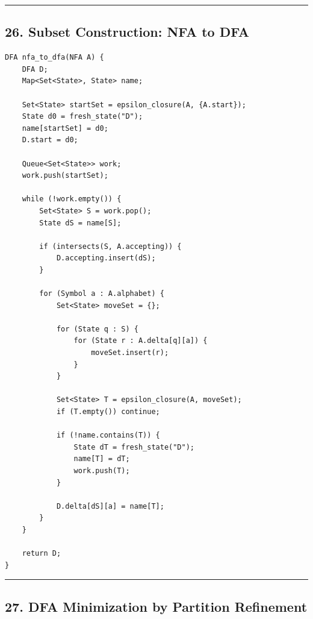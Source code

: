 \documentclass[10pt,letterpaper]{article}
\begin{document}
\medskip\hrule\medskip

\subsection*{26. Subset Construction: NFA to DFA}

\begin{verbatim}
DFA nfa_to_dfa(NFA A) {
    DFA D;
    Map<Set<State>, State> name;

    Set<State> startSet = epsilon_closure(A, {A.start});
    State d0 = fresh_state("D");
    name[startSet] = d0;
    D.start = d0;

    Queue<Set<State>> work;
    work.push(startSet);

    while (!work.empty()) {
        Set<State> S = work.pop();
        State dS = name[S];

        if (intersects(S, A.accepting)) {
            D.accepting.insert(dS);
        }

        for (Symbol a : A.alphabet) {
            Set<State> moveSet = {};

            for (State q : S) {
                for (State r : A.delta[q][a]) {
                    moveSet.insert(r);
                }
            }

            Set<State> T = epsilon_closure(A, moveSet);
            if (T.empty()) continue;

            if (!name.contains(T)) {
                State dT = fresh_state("D");
                name[T] = dT;
                work.push(T);
            }

            D.delta[dS][a] = name[T];
        }
    }

    return D;
}
\end{verbatim}

\medskip\hrule\medskip

\subsection*{27. DFA Minimization by Partition Refinement}
\end{document}
